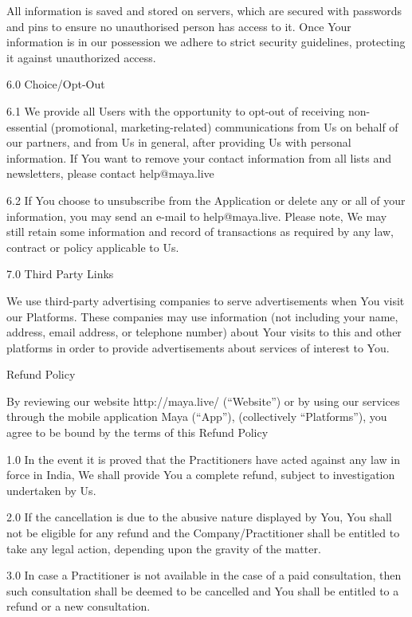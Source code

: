 All information is saved and stored on servers, which are secured with passwords and pins to ensure no unauthorised person has access to it. Once Your information is in our possession we adhere to strict security guidelines, protecting it against unauthorized access.

 

6.0      Choice/Opt-Out

6.1      We provide all Users with the opportunity to opt-out of receiving non-essential (promotional, marketing-related) communications from Us on behalf of our partners, and from Us in general, after providing Us with personal information. If You want to remove your contact information from all lists and newsletters, please contact help@maya.live

6.2      If You choose to unsubscribe from the Application or delete any or all of your information, you may send an e-mail to help@maya.live. Please note, We may still retain some information and record of transactions as required by any law, contract or policy applicable to Us.

 

7.0      Third Party Links

We use third-party advertising companies to serve advertisements when You visit our Platforms. These companies may use information (not including your name, address, email address, or telephone number) about Your visits to this and other platforms in order to provide advertisements about services of interest to You.

 

Refund Policy

 

By reviewing our website http://maya.live/ (“Website”) or by using our services through the mobile application Maya (“App”), (collectively “Platforms”), you agree to be bound by the terms of this Refund Policy

1.0    In the event it is proved that the Practitioners have acted against any law in force in India, We shall provide You a complete refund, subject to investigation undertaken by Us.

2.0     If the cancellation is due to the abusive nature displayed by You, You shall not be eligible for any refund and the Company/Practitioner shall be entitled to take any legal action, depending upon the gravity of the matter.

3.0     In case a Practitioner is not available in the case of a paid consultation, then such consultation shall be deemed to be cancelled and You shall be entitled to a refund or a new consultation.

